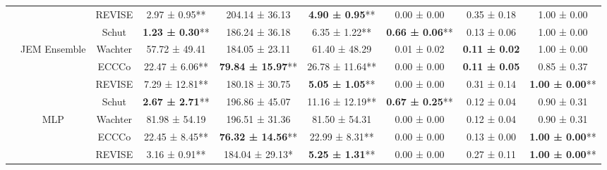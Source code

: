 \begin{table}
{\begin{tabular}[t]{ccccccccc}
 &  & REVISE & 2.97 ± 0.95** & 204.14 ± 36.13\hphantom{*}\hphantom{*} & \textbf{4.90 ± 0.95}** & 0.00 ± 0.00\hphantom{*}\hphantom{*} & 0.35 ± 0.18\hphantom{*}\hphantom{*} & 1.00 ± 0.00\hphantom{*}\hphantom{*}\\

 &  & Schut & \textbf{1.23 ± 0.30}** & 186.24 ± 36.18\hphantom{*}\hphantom{*} & 6.35 ± 1.22** & \textbf{0.66 ± 0.06}** & 0.13 ± 0.06\hphantom{*}\hphantom{*} & 1.00 ± 0.00\hphantom{*}\hphantom{*}\\

 & \multirow[t]{-4}{*}{\centering\arraybackslash JEM Ensemble} & Wachter & 57.72 ± 49.41\hphantom{*}\hphantom{*} & 184.05 ± 23.11\hphantom{*}\hphantom{*} & 61.40 ± 48.29\hphantom{*}\hphantom{*} & 0.01 ± 0.02\hphantom{*}\hphantom{*} & \textbf{0.11 ± 0.02}\hphantom{*}\hphantom{*} & 1.00 ± 0.00\hphantom{*}\hphantom{*}\\
\cmidrule{2-9}
 &  & ECCCo & 22.47 ± 6.06** & \textbf{79.84 ± 15.97}** & 26.78 ± 11.64** & 0.00 ± 0.00\hphantom{*}\hphantom{*} & \textbf{0.11 ± 0.05}\hphantom{*}\hphantom{*} & 0.85 ± 0.37\hphantom{*}\hphantom{*}\\

 &  & REVISE & 7.29 ± 12.81** & 180.18 ± 30.75\hphantom{*}\hphantom{*} & \textbf{5.05 ± 1.05}** & 0.00 ± 0.00\hphantom{*}\hphantom{*} & 0.31 ± 0.14\hphantom{*}\hphantom{*} & \textbf{1.00 ± 0.00}**\\

 &  & Schut & \textbf{2.67 ± 2.71}** & 196.86 ± 45.07\hphantom{*}\hphantom{*} & 11.16 ± 12.19** & \textbf{0.67 ± 0.25}** & 0.12 ± 0.04\hphantom{*}\hphantom{*} & 0.90 ± 0.31\hphantom{*}\hphantom{*}\\

 & \multirow[t]{-4}{*}{\centering\arraybackslash MLP} & Wachter & 81.98 ± 54.19\hphantom{*}\hphantom{*} & 196.51 ± 31.36\hphantom{*}\hphantom{*} & 81.50 ± 54.31\hphantom{*}\hphantom{*} & 0.00 ± 0.00\hphantom{*}\hphantom{*} & 0.12 ± 0.04\hphantom{*}\hphantom{*} & 0.90 ± 0.31\hphantom{*}\hphantom{*}\\
\cmidrule{2-9}
 &  & ECCCo & 22.45 ± 8.45** & \textbf{76.32 ± 14.56}** & 22.99 ± 8.31** & 0.00 ± 0.00\hphantom{*}\hphantom{*} & 0.13 ± 0.00\hphantom{*}\hphantom{*} & \textbf{1.00 ± 0.00}**\\

 &  & REVISE & 3.16 ± 0.91** & 184.04 ± 29.13*\hphantom{*} & \textbf{5.25 ± 1.31}** & 0.00 ± 0.00\hphantom{*}\hphantom{*} & 0.27 ± 0.11\hphantom{*}\hphantom{*} & \textbf{1.00 ± 0.00}**\\


\end{tabular}}
\end{table}
